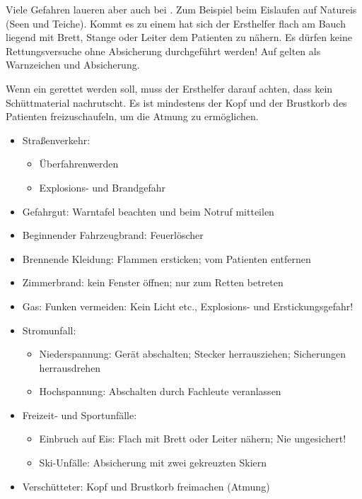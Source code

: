 {Viele Gefahren laueren aber auch bei . Zum
Beispiel beim Eislaufen auf Natureis (Seen und Teiche). Kommt es zu einem
 hat sich der Ersthelfer flach am
Bauch liegend mit Brett, Stange oder Leiter dem Patienten zu
nähern. Es dürfen keine Rettungsversuche ohne Absicherung
durchgeführt werden! Auf   gelten  als Warnzeichen
und Absicherung.

Wenn ein  gerettet werden soll, muss der Ersthelfer darauf
achten, dass kein Schüttmaterial nachrutscht. Es ist mindestens der Kopf und
der Brustkorb des Patienten freizuschaufeln, um
die Atmung zu ermöglichen.
}{
\begin{itemize}
    \item Straßenverkehr:
    \begin{itemize}
        \item Überfahrenwerden
        \item Explosions- und Brandgefahr 
    \end{itemize}
    \item Gefahrgut: Warntafel beachten und beim Notruf mitteilen
    \item Beginnender Fahrzeugbrand: Feuerlöscher 
    \item Brennende Kleidung: Flammen ersticken; vom Patienten entfernen
    \item Zimmerbrand: kein Fenster öffnen; nur zum Retten betreten
    \item Gas: Funken vermeiden: Kein Licht etc., Explosions- und
    Erstickungsgefahr!
    \item Stromunfall:
    \begin{itemize}
        \item Niederspannung: Gerät abschalten; Stecker herrausziehen;
        Sicherungen herrausdrehen
        \item Hochspannung: Abschalten durch Fachleute veranlassen
    \end{itemize}
    \item Freizeit- und Sportunfälle:
    \begin{itemize}
        \item Einbruch auf Eis: Flach mit Brett oder Leiter nähern; Nie ungesichert!
        \item Ski-Unfälle: Absicherung mit zwei gekreuzten Skiern
    \end{itemize}
    \item Verschütteter: Kopf und Brustkorb freimachen (Atmung)
\end{itemize}
}{}{}{}

